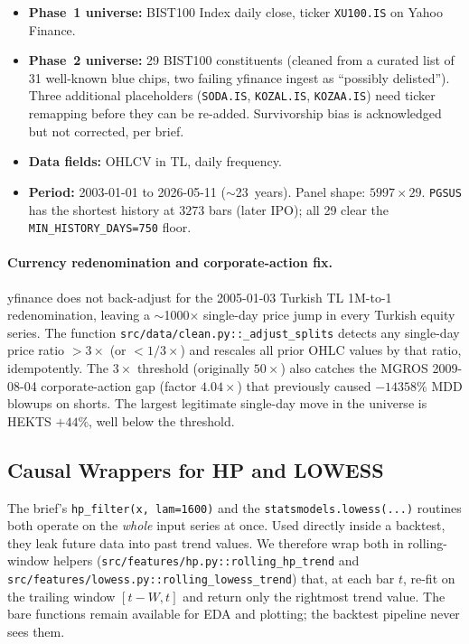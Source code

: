 \documentclass[11pt,a4paper]{article}
\begin{document}
\begin{itemize}[leftmargin=1.5em,itemsep=2pt]
    \item \textbf{Phase~1 universe:} BIST100 Index daily close, ticker
          \texttt{XU100.IS} on Yahoo Finance.
    \item \textbf{Phase~2 universe:} 29 BIST100 constituents (cleaned from a
          curated list of 31 well-known blue chips, two failing yfinance ingest
          as ``possibly delisted''). Three additional placeholders
          (\texttt{SODA.IS}, \texttt{KOZAL.IS}, \texttt{KOZAA.IS}) need ticker
          remapping before they can be re-added. Survivorship bias is
          acknowledged but not corrected, per brief.
    \item \textbf{Data fields:} OHLCV in TL, daily frequency.
    \item \textbf{Period:} 2003-01-01 to 2026-05-11 ($\sim$23~years). Panel
          shape: $5997 \times 29$. \texttt{PGSUS} has the shortest history at
          $3273$ bars (later IPO); all 29 clear the
          \texttt{MIN\_HISTORY\_DAYS=750} floor.
\end{itemize}

\paragraph{Currency redenomination and corporate-action fix.}
yfinance does not back-adjust for the 2005-01-03 Turkish TL 1M-to-1
redenomination, leaving a $\sim$1000$\times$ single-day price jump in every
Turkish equity series. The function \texttt{src/data/clean.py::\_adjust\_splits}
detects any single-day price ratio $>3\times$ (or $<1/3\times$) and rescales
all prior OHLC values by that ratio, idempotently. The $3\times$ threshold
(originally $50\times$) also catches the MGROS 2009-08-04 corporate-action gap
(factor $4.04\times$) that previously caused $-14358\%$ MDD blowups on shorts.
The largest legitimate single-day move in the universe is HEKTS $+44\%$, well
below the threshold.

\subsection{Causal Wrappers for HP and LOWESS}\label{sec:causal-wrappers}

The brief's \texttt{hp\_filter(x, lam=1600)} and the
\texttt{statsmodels.lowess(...)} routines both operate on the \emph{whole}
input series at once. Used directly inside a backtest, they leak future data
into past trend values. We therefore wrap both in rolling-window helpers
(\texttt{src/features/hp.py::rolling\_hp\_trend} and
\texttt{src/features/lowess.py::rolling\_lowess\_trend}) that, at each bar
$t$, re-fit on the trailing window $[t-W,t]$ and return only the rightmost
trend value. The bare functions remain available for EDA and plotting; the
backtest pipeline never sees them.
\end{document}
